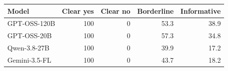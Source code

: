 \setlength{\tabcolsep}{4pt}\begin{tabular}{@{}lrrrr@{}}
\toprule
Model & Clear yes & Clear no & Borderline & Informative \\
\midrule
GPT-OSS-120B & 100 & 0 & 53.3 & 38.9 \\
GPT-OSS-20B & 100 & 0 & 57.3 & 34.8 \\
Qwen-3.8-27B & 100 & 0 & 39.9 & 17.2 \\
Gemini-3.5-FL & 100 & 0 & 43.7 & 18.2 \\
\bottomrule
\end{tabular}

